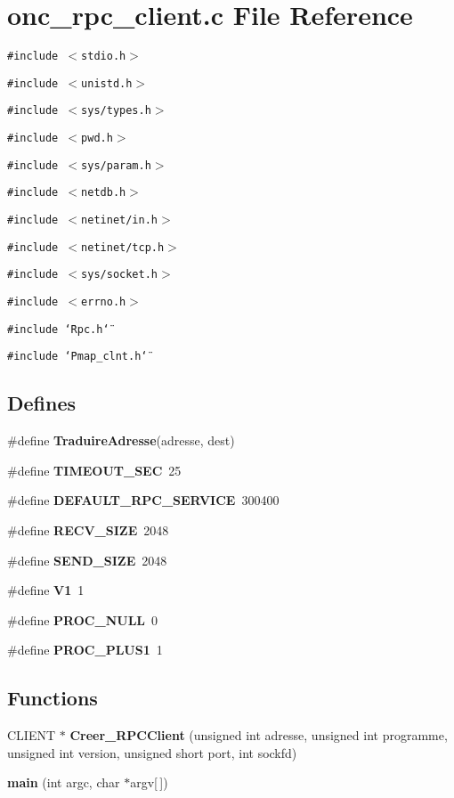 \section{onc\_\-rpc\_\-client.c File Reference}
\label{onc__rpc__client_8c}
{\tt \#include $<$stdio.h$>$}\par
{\tt \#include $<$unistd.h$>$}\par
{\tt \#include $<$sys/types.h$>$}\par
{\tt \#include $<$pwd.h$>$}\par
{\tt \#include $<$sys/param.h$>$}\par
{\tt \#include $<$netdb.h$>$}\par
{\tt \#include $<$netinet/in.h$>$}\par
{\tt \#include $<$netinet/tcp.h$>$}\par
{\tt \#include $<$sys/socket.h$>$}\par
{\tt \#include $<$errno.h$>$}\par
{\tt \#include \char`\"{}Rpc.h\char`\"{}}\par
{\tt \#include \char`\"{}Pmap\_\-clnt.h\char`\"{}}\par
\subsection*{Defines}
\begin{CompactItemize}
\item 
\#define {\bf Traduire\-Adresse}(adresse, dest)
\item 
\#define {\bf TIMEOUT\_\-SEC}\ 25
\item 
\#define {\bf DEFAULT\_\-RPC\_\-SERVICE}\ 300400
\item 
\#define {\bf RECV\_\-SIZE}\ 2048
\item 
\#define {\bf SEND\_\-SIZE}\ 2048
\item 
\#define {\bf V1}\ 1
\item 
\#define {\bf PROC\_\-NULL}\ 0
\item 
\#define {\bf PROC\_\-PLUS1}\ 1
\end{CompactItemize}
\subsection*{Functions}
\begin{CompactItemize}
\item 
CLIENT $\ast$ {\bf Creer\_\-RPCClient} (unsigned int adresse, unsigned int programme, unsigned int version, unsigned short port, int sockfd)
\item 
{\bf main} (int argc, char $\ast$argv[$\,$])
\end{CompactItemize}
